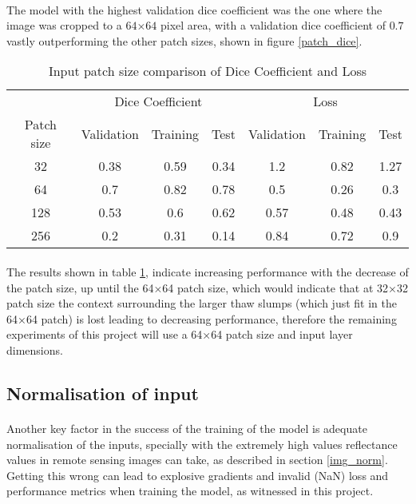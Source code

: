 \paragraph{}
The model with the highest validation dice coefficient was the one where the image was cropped to a $64$×$64$ pixel area, with a validation dice coefficient of $0.7$ vastly outperforming the other patch sizes, shown in figure \ref{patch_dice}.
\begin{table}[ht!] 
    \begin{center}
    \begin{tabular}{ccccccc} 
    \toprule
       & \multicolumn{3}{c}{Dice Coefficient}     & \multicolumn{3}{c}{Loss} \\
    Patch size & Validation & Training & Test & Validation    & Training    & Test   \\ \midrule
32 & 0.38 & 0.59 & 0.34 & 1.2 & 0.82 & 1.27 \\ \rowcolor{lightgray} 64 & 0.7 & 0.82 & 0.78 & 0.5 & 0.26 & 0.3  \\ 128 & 0.53 & 0.6 & 0.62 & 0.57 & 0.48 & 0.43  \\ 256 & 0.2 & 0.31 & 0.14 & 0.84 & 0.72 & 0.9  \\
\bottomrule
    \end{tabular}
  \end{center} 
  \caption{Input patch size comparison of Dice Coefficient and Loss}\label{tab_patch}
\end{table}
\paragraph{}
The results shown in table \ref{tab_patch}, indicate increasing performance with the decrease of the patch size, up until the 64×64 patch size, which would indicate that at 32×32 patch size the context surrounding the larger thaw slumps (which just fit in the 64×64 patch) is lost leading to decreasing performance, therefore the remaining experiments of this project will use a 64×64 patch size and input layer dimensions.
\subsection{Normalisation of input}
\paragraph{}
Another key factor in the success of the training of the model is adequate normalisation of the inputs, specially with the extremely high values reflectance values in remote sensing images can take, as described in section \ref{img_norm}. Getting this wrong can lead to explosive gradients and invalid (NaN) loss and performance metrics when training the model, as witnessed in this project.

